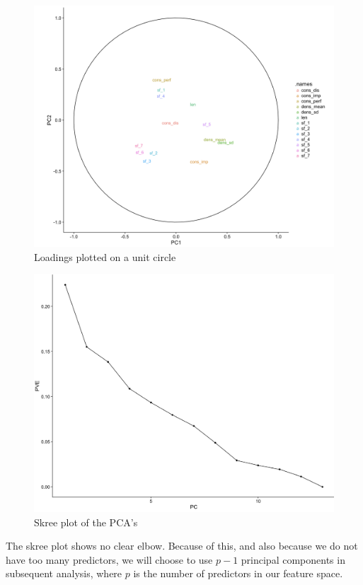 \documentclass[12pt,twoside]{reedthesis}
\theoremstyle{definition}
\theoremstyle{definition}
\theoremstyle{definition}
\theoremstyle{remark}
\begin{document}
\begin{figure}[h]
\centering
\includegraphics[scale = .3]{images/circle_bm.png}
\caption{Loadings plotted on a unit circle}
\label{subd}
\end{figure}
\begin{figure}[h]
\centering
\includegraphics[scale = .3]{images/bskree.png}
\caption{Skree plot of the PCA's}
\label{subd}
\end{figure}
The skree plot shows no clear elbow. Because of this, and also because
we do not have too many predictors, we will choose to use \(p-1\)
principal components in subsequent analysis, where \(p\) is the number
of predictors in our feature space.
\end{document}
